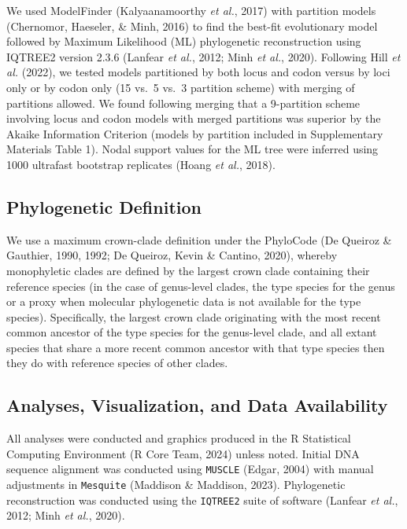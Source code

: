 \documentclass[
  letterpaper,
  DIV=11,
  numbers=noendperiod]{scrartcl}
\begin{document}
We used ModelFinder (Kalyaanamoorthy \emph{et al.}, 2017) with partition
models (Chernomor, Haeseler, \& Minh, 2016) to find the best-fit
evolutionary model followed by Maximum Likelihood (ML) phylogenetic
reconstruction using IQTREE2 version 2.3.6 (Lanfear \emph{et al.}, 2012;
Minh \emph{et al.}, 2020). Following Hill \emph{et al.} (2022), we
tested models partitioned by both locus and codon versus by loci only or
by codon only (15 vs.~5 vs.~3 partition scheme) with merging of
partitions allowed. We found following merging that a 9-partition scheme
involving locus and codon models with merged partitions was superior by
the Akaike Information Criterion (models by partition included in
Supplementary Materials Table 1). Nodal support values for the ML tree
were inferred using 1000 ultrafast bootstrap replicates (Hoang \emph{et
al.}, 2018).

\subsection{Phylogenetic Definition}\label{phylogenetic-definition}

We use a maximum crown-clade definition under the PhyloCode (De Queiroz
\& Gauthier, 1990, 1992; De Queiroz, Kevin \& Cantino, 2020), whereby
monophyletic clades are defined by the largest crown clade containing
their reference species (in the case of genus-level clades, the type
species for the genus or a proxy when molecular phylogenetic data is not
available for the type species). Specifically, the largest crown clade
originating with the most recent common ancestor of the type species for
the genus-level clade, and all extant species that share a more recent
common ancestor with that type species then they do with reference
species of other clades.

\subsection{Analyses, Visualization, and Data
Availability}\label{analyses-visualization-and-data-availability}

All analyses were conducted and graphics produced in the R Statistical
Computing Environment (R Core Team, 2024) unless noted. Initial DNA
sequence alignment was conducted using \texttt{MUSCLE} (Edgar, 2004)
with manual adjustments in \texttt{Mesquite} (Maddison \& Maddison,
2023). Phylogenetic reconstruction was conducted using the
\texttt{IQTREE2} suite of software (Lanfear \emph{et al.}, 2012; Minh
\emph{et al.}, 2020).
\end{document}
